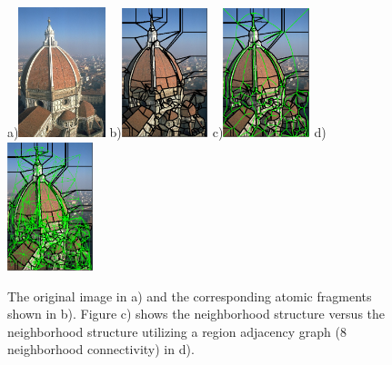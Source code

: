 \begin{figure}[ht]
\centering
a)\includegraphics[width=0.225\textwidth]{figs/24004_00.png}
b)\includegraphics[width=0.225\textwidth]{figs/24004_afs.pdf}
c)\includegraphics[width=0.225\textwidth]{figs/24004_sg.pdf}
d)\includegraphics[width=0.225\textwidth]{figs/24004_rag.pdf}
\caption{The original image in a) and the corresponding atomic fragments shown in b). Figure c) shows the neighborhood structure versus the neighborhood structure utilizing a region adjacency graph (8 neighborhood connectivity) in d). }
\label{fig:ng}
\end{figure}

%
%

